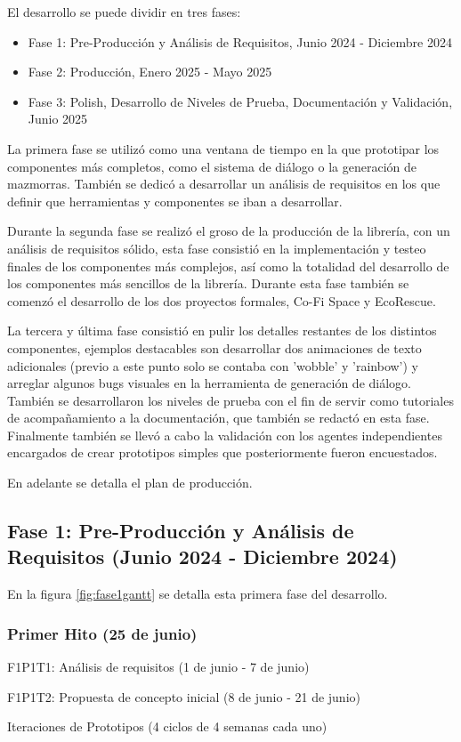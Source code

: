 El desarrollo se puede dividir en tres fases: 
\begin{itemize}
	\item Fase 1: Pre-Producción y Análisis de Requisitos, Junio 2024 - Diciembre 2024
	\item Fase 2: Producción, Enero 2025 - Mayo 2025
	\item Fase 3: Polish, Desarrollo de Niveles de Prueba, Documentación y Validación, Junio 2025
\end{itemize}

La primera fase se utilizó como una ventana de tiempo en la que prototipar los componentes más completos, como el sistema de diálogo o la generación de
 mazmorras. También se dedicó a desarrollar un análisis de requisitos en los que definir que herramientas y componentes se iban a desarrollar. 
 
Durante la segunda fase se realizó el groso de la producción de la librería, con un análisis de requisitos sólido, esta fase consistió en la implementación y testeo 
finales de los componentes más complejos, así como la totalidad del desarrollo de los componentes más sencillos de la librería. Durante esta fase también se comenzó el 
desarrollo de los dos proyectos formales, Co-Fi Space\cite{CoFiSpace} y EcoRescue\cite{EcoRescue}. 

La tercera y última fase consistió en pulir los detalles restantes de los distintos componentes, ejemplos destacables son desarrollar dos animaciones de texto adicionales 
(previo a este punto solo se contaba con 'wobble' y 'rainbow') y arreglar algunos bugs visuales en la herramienta de generación de diálogo. También se desarrollaron los niveles 
de prueba con el fin de servir como tutoriales de acompañamiento a la documentación, que también se redactó en esta fase. Finalmente también se llevó a cabo la validación 
con los agentes independientes encargados de crear prototipos simples que posteriormente fueron encuestados. 

En adelante se detalla el plan de producción.

\subsection{Fase 1: Pre-Producción y Análisis de Requisitos (Junio 2024 - Diciembre 2024)}

En la figura \ref{fig:fase1gantt} se detalla esta primera fase del desarrollo.

\subsubsection{Primer Hito (25 de junio)}
\begin{compactitem}
\item F1P1T1: Análisis de requisitos (1 de junio - 7 de junio)
\item F1P1T2: Propuesta de concepto inicial (8 de junio - 21 de junio)
\end{compactitem}
Iteraciones de Prototipos (4 ciclos de 4 semanas cada uno)


